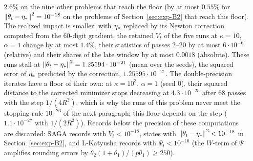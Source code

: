 $2.6\%$ on the nine other problems that reach the floor (by at most $0.55\%$ for $\left\|\theta_t-\eta_\ast\right\|^2=10^{-18}$
on the problems of Section~\ref{sec:exp-B2} that reach this floor). The realized impact is smaller: with $\eta_\ast$
replaced by its Newton correction computed from the 60-digit gradient, the retained $V_t$ of the five runs at
$\kappa=10$, $\alpha=1$ change by at most $1.4\%$, their statistics of passes 2--20 by at most $6\cdot10^{-6}$
(relative) and their shares of the late window by at most $0.0018$ (absolute). These runs stall at
$\left\|\theta_t-\eta_\ast\right\|^2=1.25594\cdot10^{-21}$ (mean over the seeds), the squared error of $\eta_\ast$ predicted by the
correction, $1.25595\cdot10^{-21}$. The double-precision iterates have a floor of their own: at $\kappa=10^3$,
$\alpha=1$ (seed $0$), their squared distance to the corrected minimizer stops decreasing at $4.3\cdot10^{-25}$ after 68
passes with the step $1/(4R^2)$, which is why the runs of this problem never meet the stopping rule $10^{-26}$ of the
next paragraph; this floor depends on the step ($1.1\cdot10^{-27}$ with $1/(2R^2)$). Records below the precision of
these computations are discarded: SAGA records with $V_t<10^{-18}$, states with $\left\|\theta_t-\eta_\ast\right\|^2<10^{-18}$ in
Section~\ref{sec:exp-B2}, and L-Katyusha records with $\Psi_t<10^{-10}$ (the $W$-term of $\Psi$ amplifies rounding
errors by $\theta_2(1+\theta_1)/(p\theta_1)\ge250$).


